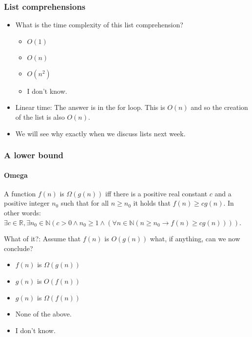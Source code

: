 \begin{frame}
	\frametitle{List comprehensions}

	\begin{itemize}
\item 
			What is the time complexity of this list comprehension?
			\begin{itemize}
				\item $O(1)$
				\item $O(n)$ 
				\item $O(n^2)$
				\item I don't know.
			\end{itemize}
\item Linear time:
		The answer is in the for loop. This is $O(n)$ and so the creation of the list is also $O(n)$. 
\item We will see why exactly when we discuss lists next week.
		\end{itemize}	
		

		
\end{frame}

\begin{frame}
	\frametitle{A lower bound}
	\framesubtitle{Omega}
	\begin{definition}
		A function $f(n)$ is $\Omega(g(n))$ iff there is a positive real constant $c$ and a positive integer $n_0$ such that for
		all $n \geq n_0$ it holds that $f(n) \geq c g(n)$. In other words:\\
		$\exists c \in \mathbb{R}, \exists n_0 \in \mathbb{N} (c > 0 \wedge n_0 \geq 1 \wedge (\forall n \in \mathbb{N} (n
		\geq n_0 \to f(n) \geq cg(n))))$.
	\end{definition}
	
What of it?:	Assume that $f(n)$ is $O(g(n))$ what, if anything, can we now conclude?
		\begin{itemize}
			\item $f(n)$ is $\Omega(g(n))$
			\item $g(n)$ is $O(f(n))$
			\item $g(n)$ is $\Omega(f(n))$
			\item None of the above.
			\item I don't know.
		\end{itemize}
\end{frame}

